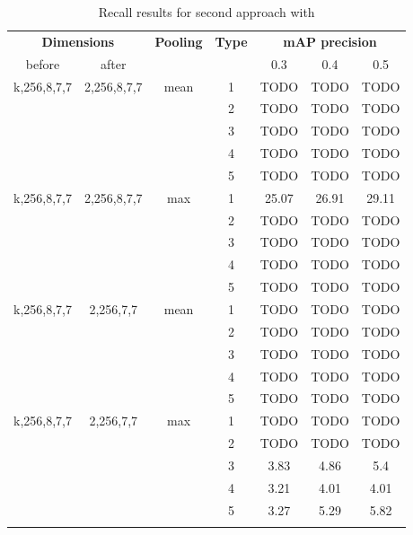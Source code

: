\begin{center}
\begin{longtable}{||c | c| c| c||c c c||}

  \hline
 \multicolumn{2}{||c|}{\textbf{Dimensions}} & \multirow{2}{*}{\textbf{Pooling}} &\multirow{2}{*}{ \textbf{Type}} &\multicolumn{3}{|c||}{\textbf{mAP precision}}\\

  before & after & {} & {} & 0.3 &  0.4 & 0.5 \\
  \hline   \hline

  \multirow{5}{*}{k,256,8,7,7} & \multirow{5}{*}{2,256,8,7,7} & \multirow{5}{*}{mean}  & 1 & TODO & TODO & TODO \\
  \cline{4-7}

  {} & {} & {} & 2 & TODO & TODO & TODO \\
  \cline{4-7}
  {} & {} & {} & 3 & TODO & TODO & TODO \\
  \cline{4-7}
  {} & {} & {} & 4 & TODO & TODO & TODO \\
  \cline{4-7}
  {} & {} & {} & 5 & TODO & TODO & TODO \\
  \hline

  \multirow{5}{*}{k,256,8,7,7} & \multirow{5}{*}{2,256,8,7,7} & \multirow{5}{*}{max}  & 1 & 25.07 & 26.91 & 29.11 \\
  \cline{4-7}

  {} & {} & {} & 2 & TODO & TODO & TODO \\
  \cline{4-7}
  {} & {} & {} & 3 & TODO & TODO & TODO \\
  \cline{4-7}
  {} & {} & {} & 4 & TODO & TODO & TODO \\
  \cline{4-7}
  {} & {} & {} & 5 & TODO & TODO & TODO \\

  \hline   \hline
  \multirow{5}{*}{k,256,8,7,7} & \multirow{5}{*}{2,256,7,7} & \multirow{5}{*}{mean}  & 1 & TODO & TODO & TODO \\
  \cline{4-7}
  {} & {} & {} & 2 & TODO & TODO & TODO \\
  \cline{4-7}
  {} & {} & {} & 3 & TODO & TODO & TODO \\
  \cline{4-7}
  {} & {} & {} & 4 & TODO & TODO & TODO \\
  \cline{4-7}
  {} & {} & {} & 5 & TODO & TODO & TODO \\
  \hline   

  \multirow{5}{*}{k,256,8,7,7} & \multirow{5}{*}{2,256,7,7} & \multirow{5}{*}{max}  & 1 & TODO & TODO & TODO \\
  \cline{4-7}
  {} & {} & {} & 2 & TODO & TODO & TODO \\
  \cline{4-7}
  {} & {} & {} & 3 & 3.83 & 4.86 & 5.4   \\
  \cline{4-7}
  {} & {} & {} & 4 & 3.21 & 4.01 & 4.01   \\
  \cline{4-7}
  {} & {} & {} & 5 & 3.27 & 5.29 & 5.82   \\
  \hline   


  \caption{Recall results for second approach with  }
  \label{table:svm_temp_pooling}
\end{longtable} 
\end{center}
  
